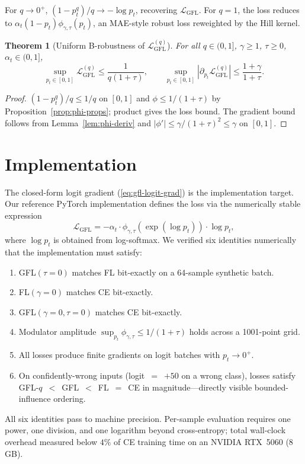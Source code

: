 \documentclass[conference]{IEEEtran}
\newtheorem{theorem}{Theorem}
\theoremstyle{definition}
\newcommand{\LGFL}{\mathcal{L}_{\mathrm{GFL}}}
\newcommand{\LGFLq}{\mathcal{L}_{\mathrm{GFL}}^{(q)}}
\begin{document}
For $q \to 0^+$, $(1-p_t^q)/q \to -\log p_t$, recovering $\LGFL$. For $q = 1$, the loss reduces to $\alpha_t (1-p_t) \phi_{\gamma,\tau}(p_t)$, an MAE-style robust loss \cite{ghosh2017robust} reweighted by the Hill kernel.

\begin{theorem}[Uniform B-robustness of $\LGFLq$]\label{thm:if-q}
For all $q \in (0,1]$, $\gamma \ge 1$, $\tau \ge 0$, $\alpha_t \in (0,1]$,
\[
\sup_{p_t \in [0,1]} \LGFLq \le \frac{1}{q(1+\tau)}, \qquad \sup_{p_t \in [0,1]} |\partial_{p_t}\LGFLq| \le \frac{1+\gamma}{1+\tau}.
\]
\end{theorem}

\begin{proof}
$(1-p_t^q)/q \le 1/q$ on $[0,1]$ and $\phi \le 1/(1+\tau)$ by Proposition~\ref{prop:phi-props}; product gives the loss bound. The gradient bound follows from Lemma~\ref{lem:phi-deriv} and $|\phi'| \le \gamma/(1+\tau)^2 \le \gamma$ on $[0,1]$.
\end{proof}

\section{Implementation}
\label{sec:impl}

The closed-form logit gradient (\ref{eq:gfl-logit-grad}) is the implementation target. Our reference PyTorch implementation defines the loss via the numerically stable expression
\[
\LGFL = -\alpha_t \cdot \phi_{\gamma,\tau}(\exp(\log p_t)) \cdot \log p_t,
\]
where $\log p_t$ is obtained from log-softmax. We verified six identities numerically that the implementation must satisfy:
\begin{enumerate}
\item GFL$(\tau{=}0)$ matches FL bit-exactly on a 64-sample synthetic batch.
\item FL$(\gamma{=}0)$ matches CE bit-exactly.
\item GFL$(\gamma{=}0,\tau{=}0)$ matches CE bit-exactly.
\item Modulator amplitude $\sup_{p_t}\phi_{\gamma,\tau} \le 1/(1+\tau)$ holds across a 1001-point grid.
\item All losses produce finite gradients on logit batches with $p_t \to 0^+$.
\item On confidently-wrong inputs (logit~$=$~$+50$ on a wrong class), losses satisfy GFL-$q$~$<$~GFL~$<$~FL~$=$~CE in magnitude---directly visible bounded-influence ordering.
\end{enumerate}
All six identities pass to machine precision. Per-sample evaluation requires one power, one division, and one logarithm beyond cross-entropy; total wall-clock overhead measured below $4\%$ of CE training time on an NVIDIA RTX~5060 (8\,GB).
\end{document}
